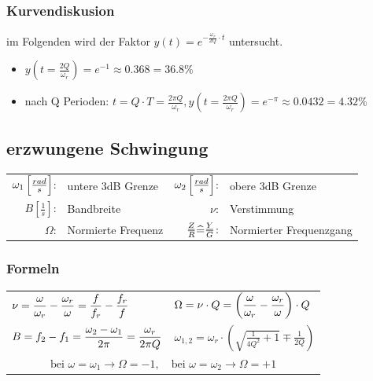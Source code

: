 \documentclass{article}
\begin{document}
\begin{twocolumn}
\subsubsection{Kurvendiskusion}
im Folgenden wird der Faktor $y(t) = e^{-\frac{\omega_r}{2 Q}\cdot t}$ untersucht. 
\begin{itemize}
  \item $y(t = \frac{2Q}{\omega_r}) = e^{-1} \approx 0.368 = 36.8\%$
  \item nach Q Perioden: $t = Q \cdot T = \frac{2 \pi Q}{\omega_r}, y(t=\frac{2\pi
  Q}{\omega_r}) = e^{-\pi} \approx 0.0432 = 4.32\%$
\end{itemize}

\subsection{erzwungene Schwingung}
\begin{definition}
  \begin{tabular}{rl|rl}
    $\omega_1 \left[\frac{rad}{s}\right]$: & untere 3dB Grenze &
    $\omega_2 \left[\frac{rad}{s}\right]$: & obere 3dB Grenze \\ 
    $B \left[ \frac{1}{s} \right]$: & Bandbreite &
    $\nu$: & Verstimmung \\
    $\Omega$: & Normierte Frequenz &
    $\frac{\underline{Z}}{R} \widehat{=} \frac{\underline{Y}}{G}$: & Normierter Frequenzgang \\
  \end{tabular}
\end{definition}

\subsubsection{Formeln}

\begin{tabularx}{\columnwidth}{YY}
  $\displaystyle \nu = \frac{\omega}{\omega_r} - \frac{\omega_r}{\omega} = \frac{f}{f_r} -
  \frac{f_r}{f}$ &
  $\displaystyle \Omega = \nu \cdot Q = \left( \frac{\omega}{\omega_r} - \frac{\omega_r}{\omega}
  \right) \cdot Q$ \\
  $\displaystyle B = f_2 - f_1 = \frac{\omega_2 - \omega_1}{2\pi} = \frac{\omega_r}{2\pi Q}$ &
  $\omega_{1,2} = \omega_r \cdot \left(\sqrt{\frac{1}{4Q^2}+1} \mp \frac{1}{2Q}\right)$ \\
   \\ \hline
\end{tabularx}


\end{twocolumn}
\end{document}
